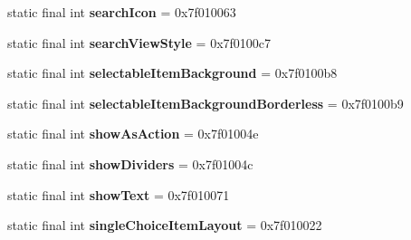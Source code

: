 \begin{DoxyCompactItemize}
\item 
\hypertarget{classandroid_1_1support_1_1design_1_1_r_1_1attr_af4e20c1cd34c6894a650951c9fc9f500}{}static final int {\bfseries search\+Icon} = 0x7f010063\label{classandroid_1_1support_1_1design_1_1_r_1_1attr_af4e20c1cd34c6894a650951c9fc9f500}

\item 
\hypertarget{classandroid_1_1support_1_1design_1_1_r_1_1attr_afef575fcb76e77c6ba1ba916c8ab454d}{}static final int {\bfseries search\+View\+Style} = 0x7f0100c7\label{classandroid_1_1support_1_1design_1_1_r_1_1attr_afef575fcb76e77c6ba1ba916c8ab454d}

\item 
\hypertarget{classandroid_1_1support_1_1design_1_1_r_1_1attr_a718cace72d8869013d368f9dd6b0dc8b}{}static final int {\bfseries selectable\+Item\+Background} = 0x7f0100b8\label{classandroid_1_1support_1_1design_1_1_r_1_1attr_a718cace72d8869013d368f9dd6b0dc8b}

\item 
\hypertarget{classandroid_1_1support_1_1design_1_1_r_1_1attr_a9d19a9ebdb5ef3038ff33d8c296961cf}{}static final int {\bfseries selectable\+Item\+Background\+Borderless} = 0x7f0100b9\label{classandroid_1_1support_1_1design_1_1_r_1_1attr_a9d19a9ebdb5ef3038ff33d8c296961cf}

\item 
\hypertarget{classandroid_1_1support_1_1design_1_1_r_1_1attr_a65f3be01de445a1c54d6686b1db7e0a6}{}static final int {\bfseries show\+As\+Action} = 0x7f01004e\label{classandroid_1_1support_1_1design_1_1_r_1_1attr_a65f3be01de445a1c54d6686b1db7e0a6}

\item 
\hypertarget{classandroid_1_1support_1_1design_1_1_r_1_1attr_acae95fa1917264bc837b5d2e2bb5fe72}{}static final int {\bfseries show\+Dividers} = 0x7f01004c\label{classandroid_1_1support_1_1design_1_1_r_1_1attr_acae95fa1917264bc837b5d2e2bb5fe72}

\item 
\hypertarget{classandroid_1_1support_1_1design_1_1_r_1_1attr_a2365c2af635790d16f8a9f9b7c3a7c30}{}static final int {\bfseries show\+Text} = 0x7f010071\label{classandroid_1_1support_1_1design_1_1_r_1_1attr_a2365c2af635790d16f8a9f9b7c3a7c30}

\item 
\hypertarget{classandroid_1_1support_1_1design_1_1_r_1_1attr_a3ce837e924669fb989055820e631240b}{}static final int {\bfseries single\+Choice\+Item\+Layout} = 0x7f010022\label{classandroid_1_1support_1_1design_1_1_r_1_1attr_a3ce837e924669fb989055820e631240b}


\end{DoxyCompactItemize}
